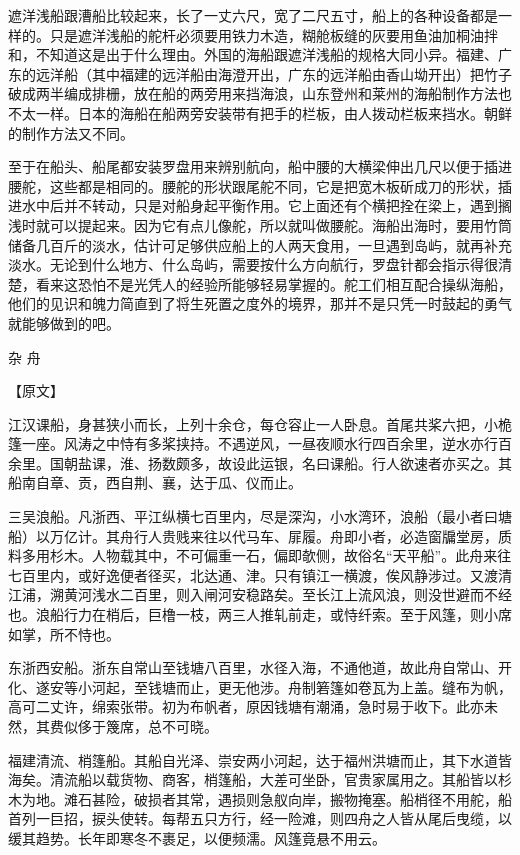 \documentclass[12pt,UTF8]{ctexbook}
\begin{document}
遮洋浅船跟漕船比较起来，长了一丈六尺，宽了二尺五寸，船上的各种设备都是一样的。只是遮洋浅船的舵杆必须要用铁力木造，糊舱板缝的灰要用鱼油加桐油拌和，不知道这是出于什么理由。外国的海船跟遮洋浅船的规格大同小异。福建、广东的远洋船（其中福建的远洋船由海澄开出，广东的远洋船由香山坳开出）把竹子破成两半编成排栅，放在船的两旁用来挡海浪，山东登州和莱州的海船制作方法也不太一样。日本的海船在船两旁安装带有把手的栏板，由人拨动栏板来挡水。朝鲜的制作方法又不同。

至于在船头、船尾都安装罗盘用来辨别航向，船中腰的大横梁伸出几尺以便于插进腰舵，这些都是相同的。腰舵的形状跟尾舵不同，它是把宽木板斫成刀的形状，插进水中后并不转动，只是对船身起平衡作用。它上面还有个横把拴在梁上，遇到搁浅时就可以提起来。因为它有点儿像舵，所以就叫做腰舵。海船出海时，要用竹筒储备几百斤的淡水，估计可足够供应船上的人两天食用，一旦遇到岛屿，就再补充淡水。无论到什么地方、什么岛屿，需要按什么方向航行，罗盘针都会指示得很清楚，看来这恐怕不是光凭人的经验所能够轻易掌握的。舵工们相互配合操纵海船，他们的见识和魄力简直到了将生死置之度外的境界，那并不是只凭一时鼓起的勇气就能够做到的吧。

杂 舟

【原文】

江汉课船，身甚狭小而长，上列十余仓，每仓容止一人卧息。首尾共桨六把，小桅篷一座。风涛之中恃有多桨挟持。不遇逆风，一昼夜顺水行四百余里，逆水亦行百余里。国朝盐课，淮、扬数颇多，故设此运银，名曰课船。行人欲速者亦买之。其船南自章、贡，西自荆、襄，达于瓜、仪而止。

三吴浪船。凡浙西、平江纵横七百里内，尽是深沟，小水湾环，浪船（最小者曰塘船）以万亿计。其舟行人贵贱来往以代马车、屝履。舟即小者，必造窗牖堂房，质料多用杉木。人物载其中，不可偏重一石，偏即欹侧，故俗名“天平船”。此舟来往七百里内，或好逸便者径买，北达通、津。只有镇江一横渡，俟风静涉过。又渡清江浦，溯黄河浅水二百里，则入闸河安稳路矣。至长江上流风浪，则没世避而不经也。浪船行力在梢后，巨橹一枝，两三人推轧前走，或恃纤索。至于风篷，则小席如掌，所不恃也。

东浙西安船。浙东自常山至钱塘八百里，水径入海，不通他道，故此舟自常山、开化、遂安等小河起，至钱塘而止，更无他涉。舟制箬篷如卷瓦为上盖。缝布为帆，高可二丈许，绵索张带。初为布帆者，原因钱塘有潮涌，急时易于收下。此亦未然，其费似侈于篾席，总不可晓。

福建清流、梢篷船。其船自光泽、崇安两小河起，达于福州洪塘而止，其下水道皆海矣。清流船以载货物、商客，梢篷船，大差可坐卧，官贵家属用之。其船皆以杉木为地。滩石甚险，破损者其常，遇损则急舣向岸，搬物掩塞。船梢径不用舵，船首列一巨招，捩头使转。每帮五只方行，经一险滩，则四舟之人皆从尾后曳缆，以缓其趋势。长年即寒冬不裹足，以便频濡。风篷竟悬不用云。
\end{document}
